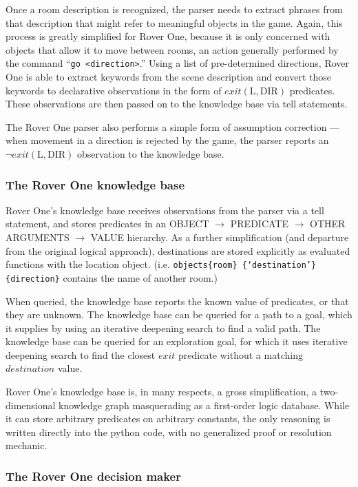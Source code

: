 Once a room description is recognized, the parser needs to extract
phrases from that description that might refer to meaningful objects in
the game. Again, this process is greatly simplified for Rover One,
because it is only concerned with objects that allow it to move between
rooms, an action generally performed by the command ``\texttt{go
<direction>}.'' Using a list of pre-determined directions, Rover One is
able to extract keywords from the scene description and convert those
keywords to declarative observations in the form of
$exit(\text{L}, \text{DIR})$ predicates. These observations are then
passed on to the knowledge base via tell statements.

The Rover One parser also performs a simple form of assumption
correction --- when movement in a direction is rejected by the game, the
parser reports an $\lnot exit(\text{L}, \text{DIR})$ observation to the
knowledge base.

\subsubsection{The Rover One knowledge base}

Rover One's knowledge base receives observations from the parser via a
tell statement, and stores predicates in an OBJECT $\rightarrow$
PREDICATE $\rightarrow$ OTHER ARGUMENTS $\rightarrow$ VALUE hierarchy.
As a further simplification (and departure from the original logical
approach), destinations are stored explicitly as evaluated functions
with the location object. (i.e. \texttt{objects\{room\}
\{`destination'\}\{direction\}} contains the name of another room.)

When queried, the knowledge base reports the known value of predicates,
or that they are unknown. The knowledge base can be queried for a path
to a goal, which it supplies by using an iterative deepening search to
find a valid path. The knowledge base can be queried for an exploration
goal, for which it uses iterative deepening search to find the closest
$exit$ predicate without a matching $destination$ value.

Rover One's knowledge base is, in many respects, a gross simplification,
a two-dimensional knowledge graph masquerading as a first-order logic
database. While it can store arbitrary predicates on arbitrary
constants, the only reasoning is written directly into the python code,
with no generalized proof or resolution mechanic.

\subsubsection{The Rover One decision maker}

